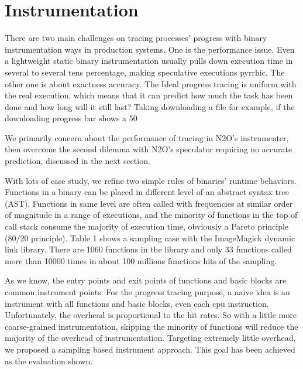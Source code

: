 \section{Instrumentation}

There are two main challenges on tracing processes’ progress with binary instrumentation ways in production systems. One is the performance issue. Even a lightweight static binary instrumentation usually pulls down execution time in several to several tens percentage, making speculative executions pyrrhic.  The other one is about exactness accuracy. The Ideal progress tracing is uniform with the real execution, which means that it can predict how much the task has been done and how long will it still last? Taking downloading a file for example, if the downloading progress bar shows a 50%

We primarily concern about the performance of tracing in N2O’s instrumenter, then overcome the second dilemma with N2O’s speculator requiring no accurate prediction, discussed in the next section.

With lots of case study, we refine two simple rules of binaries’ runtime behaviors. Functions in a binary can be placed in different level of an abstract syntax tree (AST). Functions in same level are often called with frequencies at similar order of magnitude in a range of executions, and the minority of functions in the top of call stack consume the majority of execution time, obviously a Pareto principle (80/20 principle). Table 1 shows a sampling case with the ImageMagick dynamic link library. There are 1060 functions in the library and only 33 functions called more than 10000 times in about 100 millions functions hits of the sampling.



As we know, the entry points and exit points of functions and basic blocks are common instrument points. For the progress tracing purpose, a naive idea is an instrument with all functions and basic blocks, even each cpu instruction. Unfortunately, the overhead is proportional to the hit rates. So with a little more coarse-grained instrumentation, skipping the minority of functions will reduce the majority of the overhead of instrumentation. Targeting extremely little overhead, we proposed a sampling based instrument approach. This goal has been achieved as the evaluation shown.

